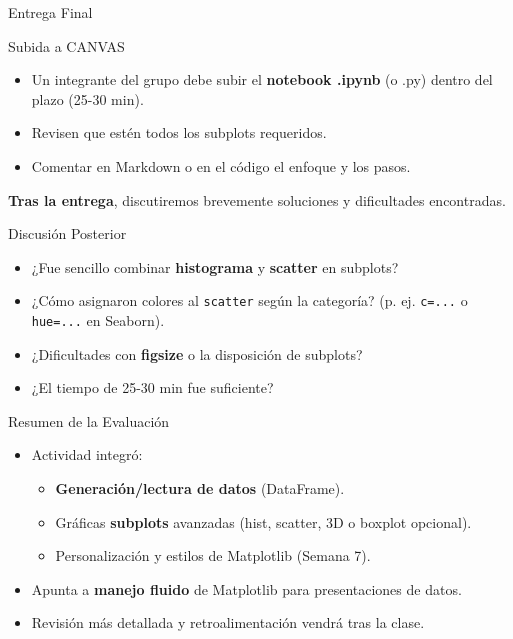 \documentclass[10pt]{beamer}
\begin{document}
\begin{frame}{Entrega Final}
  \begin{block}{Subida a CANVAS}
    \begin{itemize}
      \item Un integrante del grupo debe subir el \textbf{notebook .ipynb} (o .py) dentro del plazo (25-30 min).
      \item Revisen que estén todos los subplots requeridos.
      \item Comentar en Markdown o en el código el enfoque y los pasos.
    \end{itemize}
  \end{block}
  \vspace{0.3cm}
  \textbf{Tras la entrega}, discutiremos brevemente soluciones y dificultades encontradas.
\end{frame}

\begin{frame}{Discusión Posterior}
  \begin{itemize}
    \item ¿Fue sencillo combinar \textbf{histograma} y \textbf{scatter} en subplots?
    \item ¿Cómo asignaron colores al \texttt{scatter} según la categoría? (p. ej. \texttt{c=...} o \texttt{hue=...} en Seaborn).
    \item ¿Dificultades con \textbf{figsize} o la disposición de subplots?
    \item ¿El tiempo de 25-30 min fue suficiente?
  \end{itemize}
\end{frame}

\begin{frame}{Resumen de la Evaluación}
  \begin{itemize}
    \item Actividad integró:
      \begin{itemize}
        \item \textbf{Generación/lectura de datos} (DataFrame).
        \item Gráficas \textbf{subplots} avanzadas (hist, scatter, 3D o boxplot opcional).
        \item Personalización y estilos de Matplotlib (Semana 7).
      \end{itemize}
    \item Apunta a \textbf{manejo fluido} de Matplotlib para presentaciones de datos.
    \item Revisión más detallada y retroalimentación vendrá tras la clase.
  \end{itemize}
\end{frame}
\end{document}
